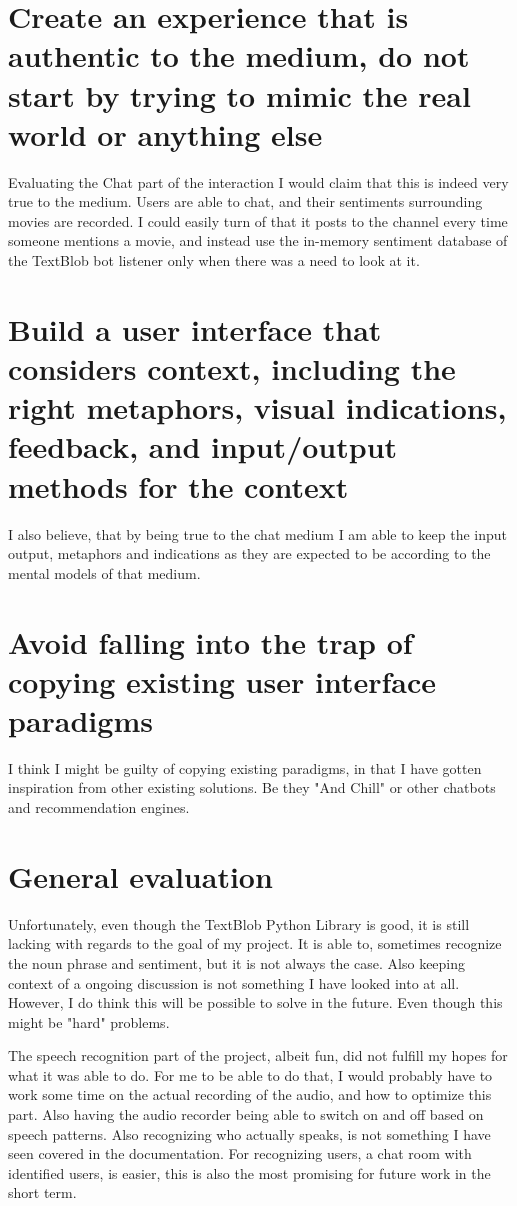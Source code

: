 \documentclass[11pt,fleqn]{book} %
\begin{document}
\section{Create an experience that is authentic to the medium, do not start by trying to
mimic the real world or anything else}
Evaluating the Chat part of the interaction I would claim that this is indeed very true to the medium. Users are able to chat, and their sentiments surrounding movies are recorded. I could easily turn of that it posts to the channel every time someone mentions a movie, and instead use the in-memory sentiment database of the TextBlob bot listener only when there was a need to look at it.

\section{Build a user interface that considers context, including the right metaphors,
visual indications, feedback, and input/output methods for the context}
I also believe, that by being true to the chat medium I am able to keep the input output, metaphors and indications as they are expected to be according to the mental models of that medium.

\section{Avoid falling into the trap of copying existing user interface paradigms}
I think I might be guilty of copying existing paradigms, in that I have gotten inspiration from other existing solutions. Be they "And Chill"\cite{Williams2016TheUK} or other chatbots and recommendation engines.

\section{General evaluation}
Unfortunately, even though the TextBlob\cite{TextBlobTutorial:Documentation} Python Library is good, it is still lacking with regards to the goal of my project.
It is able to, sometimes recognize the noun phrase and sentiment, but it is not always the case.
Also keeping context of a ongoing discussion is not something I have looked into at all.
However, I do think this will be possible to solve in the future.
Even though this might be "hard" problems.

The speech recognition part of the project, albeit fun, did not fulfill my hopes for what it was able to do. For me to be able to do that, I would probably have to work some time on the actual recording of the audio, and how to optimize this part. Also having the audio recorder being able to switch on and off based on speech patterns.
Also recognizing who actually speaks, is not something I have seen covered in the documentation.
For recognizing users, a chat room with identified users, is easier, this is also the most promising for future work in the short term.
\end{document}
